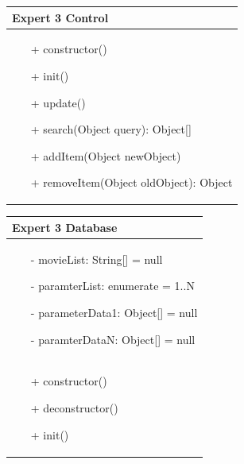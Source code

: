 \documentclass[]{article}
\begin{document}
\begin{table}[H]
\centering
\begin{tabular}{|>{\centering\arraybackslash}p{10cm}|}
\hline
Expert 3 Control\\
\hline
\begin{itemize}
\item[+] constructor()
\item[+] init()
\item[+] update()
\item[+] search(Object query): Object[]
\item[+] addItem(Object newObject)
\item[+] removeItem(Object oldObject): Object
\end{itemize}
\\
\hline
\end{tabular}
\end{table}
%
\begin{table}[H]
\centering
\begin{tabular}{|>{\centering\arraybackslash}p{10cm}|}
\hline
Expert 3 Database\\
\hline
\begin{itemize}
\item[-] movieList: String[] = null
\item[-] paramterList: enumerate = 1..N
\item[-] parameterData1: Object[] = null
\item[-] paramterDataN: Object[] = null
\end{itemize}
\\
\hline
\begin{itemize}
\item[+] constructor()
\item[+] deconstructor()
\item[+] init()
\end{itemize}
\\
\hline
\end{tabular}
\end{table}

\newpage
\clearpage
\appendix
\end{document}
